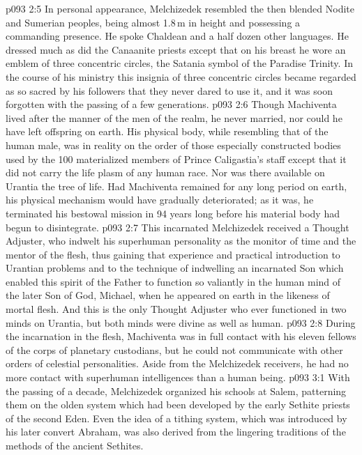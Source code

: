 \vs p093 2:5 \pc In personal appearance, Melchizedek resembled the then blended Nodite and Sumerian peoples, being almost 1.8\,m in height and possessing a commanding presence. He spoke Chaldean and a half dozen other languages. He dressed much as did the Canaanite priests except that on his breast he wore an emblem of three concentric circles, the Satania symbol of the Paradise Trinity. In the course of his ministry this insignia of three concentric circles became regarded as so sacred by his followers that they never dared to use it, and it was soon forgotten with the passing of a few generations.
\vs p093 2:6 Though Machiventa lived after the manner of the men of the realm, he never married, nor could he have left offspring on earth. His physical body, while resembling that of the human male, was in reality on the order of those especially constructed bodies used by the 100 materialized members of Prince Caligastia’s staff except that it did not carry the life plasm of any human race. Nor was there available on Urantia the tree of life. Had Machiventa remained for any long period on earth, his physical mechanism would have gradually deteriorated; as it was, he terminated his bestowal mission in 94 years long before his material body had begun to disintegrate.
\vs p093 2:7 \pc This incarnated Melchizedek received a Thought Adjuster, who indwelt his superhuman personality as the monitor of time and the mentor of the flesh, thus gaining that experience and practical introduction to Urantian problems and to the technique of indwelling an incarnated Son which enabled this spirit of the Father to function so valiantly in the human mind of the later Son of God, Michael, when he appeared on earth in the likeness of mortal flesh. And this is the only Thought Adjuster who ever functioned in two minds on Urantia, but both minds were divine as well as human.
\vs p093 2:8 During the incarnation in the flesh, Machiventa was in full contact with his eleven fellows of the corps of planetary custodians, but he could not communicate with other orders of celestial personalities. Aside from the Melchizedek receivers, he had no more contact with superhuman intelligences than a human being.
\vs p093 3:1 With the passing of a decade, Melchizedek organized his schools at Salem, patterning them on the olden system which had been developed by the early Sethite priests of the second Eden. Even the idea of a tithing system, which was introduced by his later convert Abraham, was also derived from the lingering traditions of the methods of the ancient Sethites.

